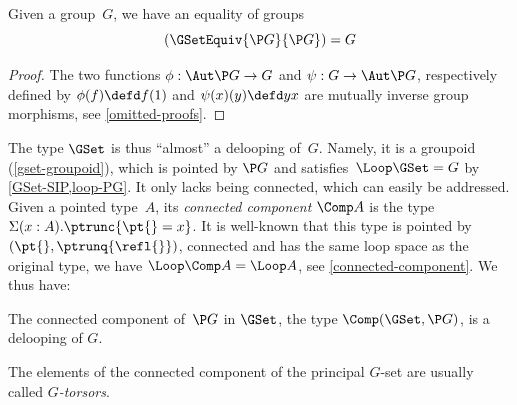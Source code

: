 \begin{proposition}
  \label{loop-PG}
  Given a group~$G$, we have an equality of groups
  \[
    (\GSetEquiv{\P G}{\P G})=G
  \]
\end{proposition}
\begin{proof}
  The two functions
  $\phi:\Aut\P G\to G$ and $\psi:G\to\Aut\P G$, respectively defined by
  $\phi(f)\defd f(1)$ and $\psi(x)(y)\defd yx$ are mutually inverse group
  morphisms, see \cref{omitted-proofs}.
\end{proof}

The type $\GSet$ is thus ``almost'' a delooping of~$G$. Namely, it is a groupoid
(\cref{gset-groupoid}), which is pointed by $\P G$ and satisfies~$\Loop\GSet = G$ by
\cref{GSet-SIP,loop-PG}. It only lacks being connected, which can easily be
addressed. Given a pointed type~$A$, its \emph{connected component} $\Comp A$ is
the type $\Sigma(x:A).\ptrunc{\pt{}=x}$. It is well-known that this type is
pointed by $(\pt{},\ptrunq{\refl{}})$, connected and has the same loop space as
the original type, \ie we have $\Loop\Comp A=\Loop A$, see
\cref{connected-component}. We thus have:

\begin{theorem}
  \label{PG-delooping}
  The connected component of~$\P G$ in $\GSet$, \ie the type
  $\Comp(\GSet,\P G)$, is a delooping of $G$.
\end{theorem}

\noindent
The elements of the connected component of the principal $G$-set are usually
called \emph{$G$-torsors}.
